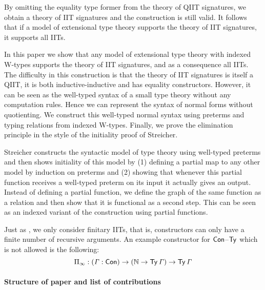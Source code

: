 \documentclass[a4paper,UKenglish,cleveref, autoref]{lipics-v2019}
\begin{document}
By omitting the equality type former from the theory of QIIT
signatures, we obtain a theory of IIT signatures and the construction
is still valid. It follows that if a model of extensional type theory
supports the theory of IIT signatures, it supports all IITs.

In this paper we show that any model of extensional type theory with
indexed W-types supports the theory of IIT signatures, and as a
consequence all IITs. The difficulty in this construction is that the
theory of IIT signatures is itself a QIIT, it is both
inductive-inductive and has equality constructors. However, it can be
seen as the well-typed syntax of a small type theory without any
computation rules. Hence we can represent the syntax of normal forms
without quotienting. We construct this well-typed normal syntax using
preterms and typing relations from indexed W-types. Finally, we prove
the elimination principle in the style of the initiality proof of
Streicher.

Streicher \cite{streichersemantics} constructs the syntactic model of
type theory using well-typed preterms and then shows initiality of
this model by (1) defining a partial map to any other model by
induction on preterms and (2) showing that whenever this partial
function receives a well-typed preterm on its input it actually gives
an output. Instead of defining a partial function, we define the graph
of the same function as a relation and then show that it is functional
as a second step. This can be seen as an indexed variant of the
construction using partial functions.

Just as \cite{Kaposi:2019:CQI:3302515.3290315}, we only consider
finitary IITs, that is, constructors can only have a finite number of
recursive arguments. An example constructor for $\mathsf{Con}$--$\mathsf{Ty}$ which is
not allowed is the following:
\[
  \Pi_\infty : (\mathit{\Gamma} : \mathsf{Con}) \rightarrow (\mathbb{N} \rightarrow \mathsf{Ty}\,\mathit{\Gamma}) \rightarrow \mathsf{Ty}\,\mathit{\Gamma}
\]

\paragraph*{Structure of paper and list of contributions}
\end{document}
